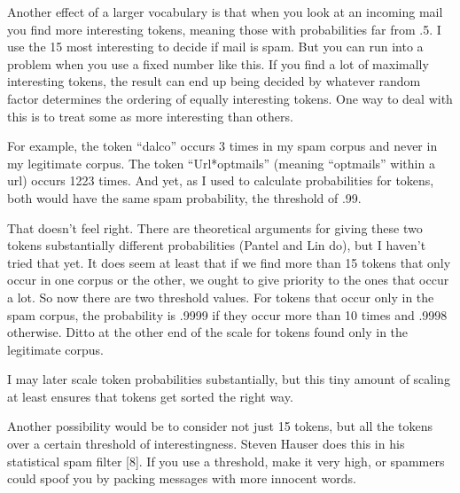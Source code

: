 Another
                  effect of a larger vocabulary is that when you look at an
                  incoming mail you find more interesting tokens, meaning those
                  with probabilities far from .5. I use the 15 most interesting
                  to decide if mail is spam. But you can run into a problem when
                  you use a fixed number like this. If you find a lot of
                  maximally interesting tokens, the result can end up being
                  decided by whatever random factor determines the ordering of
                  equally interesting tokens. One way to deal with this is to
                  treat some as more interesting than others.

For
                  example, the token ``dalco'' occurs 3 times in my spam corpus
                  and never in my legitimate corpus. The token ``Url*optmails''
                  (meaning ``optmails'' within a url) occurs 1223 times. And
                  yet, as I used to calculate probabilities for tokens, both
                  would have the same spam probability, the threshold of .99.

That
                  doesn't feel right. There are theoretical arguments for giving
                  these two tokens substantially different probabilities (Pantel
                  and Lin do), but I haven't tried that yet. It does seem at
                  least that if we find more than 15 tokens that only occur in
                  one corpus or the other, we ought to give priority to the ones
                  that occur a lot. So now there are two threshold values. For
                  tokens that occur only in the spam corpus, the probability is
                  .9999 if they occur more than 10 times and .9998 otherwise.
                  Ditto at the other end of the scale for tokens found only in
                  the legitimate corpus.

I may later scale token
                  probabilities substantially, but this tiny amount of scaling
                  at least ensures that tokens get sorted the right way.

Another
                  possibility would be to consider not just 15 tokens, but all
                  the tokens over a certain threshold of interestingness. Steven
                  Hauser does this in his statistical spam filter [8]. If you
                  use a threshold, make it very high, or spammers could spoof
                  you by packing messages with more innocent words.

